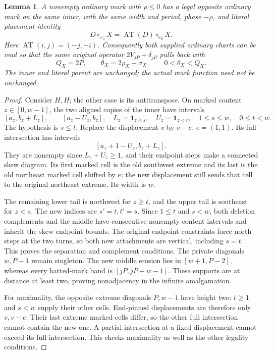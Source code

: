 \documentclass[11pt,a4paper]{amsart}
\numberwithin{equation}{section}
\theoremstyle{plain}
\newtheorem{lemma}[theorem]{Lemma}
\theoremstyle{definition}
\begin{document}
\begin{lemma}\label{lem:oo-positive-gauge}
A nonempty ordinary mark with \(\rho\le0\) has a legal opposite ordinary mark on the same inner, with the same width and period, phase \(-\rho\), and literal placement identity
\[
 D\circ_{\omega_a}X=\operatorname{AT}(D)\circ_{\omega_b}X.
\]
Here \(\operatorname{AT}(i,j)=(-j,-i)\).  Consequently both supplied ordinary charts can be read so that the same original operator \(2V_{jP}+\delta_{jP}\) pulls back with
\[
 Q_X=2P,\qquad \theta_X=2\rho_X+\sigma_X,
 \qquad 0<\theta_X<Q_X.
\]
The inner and literal parent are unchanged; the actual mark function need not be unchanged.
\end{lemma}
\begin{proof}
Consider \(H,H\); the other case is its antitranspose.  On marked content \(z\in[0,w-1]\), the two aligned copies of the inner have intervals
\[
 [a_z,b_z+L_z],\qquad[a_z-U_z,b_z],\quad
 L_z=\mathbf1_{z\ge s},\quad U_z=\mathbf1_{z<t},
 \quad1\le s\le w,\quad0\le t<w.
\]
The hypothesis is \(s\le t\).  Replace the displacement \(v\) by \(v-e\), \(e=(1,1)\).  Its full intersection has intervals
\[
 [a_z+1-U_z,b_z+L_z].
\]
They are nonempty since \(L_z+U_z\ge1\), and their endpoint steps make a connected skew diagram.  Its first marked cell is the old southwest extreme and its last is the old northeast marked cell shifted by \(e\); the new displacement still sends that cell to the original northeast extreme.  Its width is \(w\).

The remaining lower tail is northwest for \(z\ge t\), and the upper tail is southeast for \(z<s\).  The new indices are \(s'=t,t'=s\).  Since \(1\le t\) and \(s<w\), both deletion complements and the middle have consecutive nonempty content intervals and inherit the skew endpoint bounds.  The original endpoint constraints force north steps at the two turns, so both new attachments are vertical, including \(s=t\).  This proves the separation and complement conditions.  The private diagonals \(w,P-1\) remain singleton.  The new middle erosion lies in \([w+1,P-2]\), whereas every hatted-mark band is \([jP,jP+w-1]\).  These supports are at distance at least two, proving nonadjacency in the infinite amalgamation.

For maximality, the opposite extreme diagonals \(P,w-1\) have height two: \(t\ge1\) and \(s<w\) supply their other cells.  End-pinned displacements are therefore only \(v,v-e\).  Their last extreme marked cells differ, so the other full intersection cannot contain the new one.  A partial intersection at a fixed displacement cannot exceed its full intersection.  This checks maximality as well as the other legality conditions.


\end{proof}
\end{document}
